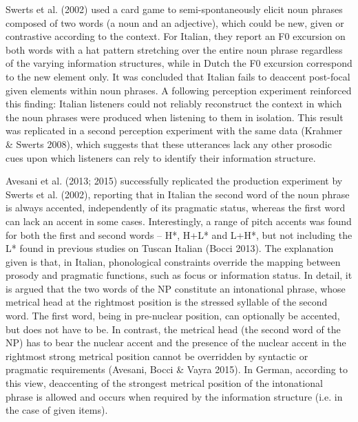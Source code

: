 \begin{styleStandard}
Swerts et al. (2002) used a card game to semi-spontaneously elicit noun phrases composed of two words (a noun and an adjective), which could be new, given or contrastive according to the context. For Italian, they report an F0 excursion on both words with a hat pattern stretching over the entire noun phrase regardless of the varying information structures, while in Dutch the F0 excursion correspond to the new element only. It was concluded that Italian fails to deaccent post-focal given elements within noun phrases. A following perception experiment reinforced this finding: Italian listeners could not reliably reconstruct the context in which the noun phrases were produced when listening to them in isolation. This result was replicated in a second perception experiment with the same data (Krahmer \& Swerts 2008), which suggests that these utterances lack any other prosodic cues upon which listeners can rely to identify their information structure.
\end{styleStandard}

\begin{styleStandard}
Avesani et al. (2013; 2015) successfully replicated the production experiment by Swerts et al. (2002), reporting that in Italian the second word of the noun phrase is always accented, independently of its pragmatic status, whereas the first word can lack an accent in some cases. Interestingly, a range of pitch accents was found for both the first and second words – H*, H+L* and L+H*, but not including the L* found in previous studies on Tuscan Italian (Bocci 2013). The explanation given is that, in Italian, phonological constraints override the mapping between prosody and pragmatic functions, such as focus or information status. In detail, it is argued that the two words of the NP constitute an intonational phrase, whose metrical head at the rightmost position is the stressed syllable of the second word. The first word, being in pre-nuclear position, can optionally be accented, but does not have to be. In contrast, the metrical head (the second word of the NP) has to bear the nuclear accent and the presence of the nuclear accent in the rightmost strong metrical position cannot be overridden by syntactic or pragmatic requirements (Avesani, Bocci \& Vayra 2015). In German, according to this view, deaccenting of the strongest metrical position of the intonational phrase is allowed and occurs when required by the information structure (i.e. in the case of given items).
\end{styleStandard}

